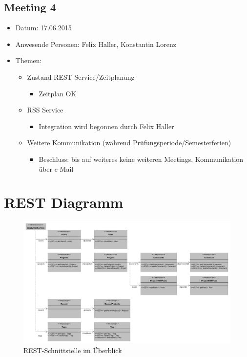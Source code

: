 \documentclass[12pt]{scrartcl}
\begin{document}
		\subsection{Meeting 4}
		\begin{itemize}
			\item Datum: 17.06.2015
			\item Anwesende Personen: Felix Haller, Konstantin Lorenz
			\item Themen:
			\begin{itemize}
				\item Zustand REST Service/Zeitplanung
				\begin{itemize}
					\item Zeitplan OK
				\end{itemize}
				\item RSS Service
				\begin{itemize}
					\item Integration wird begonnen durch Felix Haller
				\end{itemize}
				\item Weitere Kommunikation (während Prüfungsperiode/Semesterferien)
				\begin{itemize}
					\item Beschluss: bis auf weiteres keine weiteren Meetings, Kommunikation über e-Mail
				\end{itemize}
			\end{itemize}
		\end{itemize}
		\section{REST Diagramm} \label{sec:restdiagramm}
			\begin{landscape}
			 \begin{figure}
			  \centering
			  \includegraphics[width=\linewidth,height=\textheight,keepaspectratio]{Bilder/rest.pdf} 
			  \caption{REST-Schnittstelle im Überblick}
			  \label{fig:rest}
			 \end{figure}
			\end{landscape}
		
\end{document}
